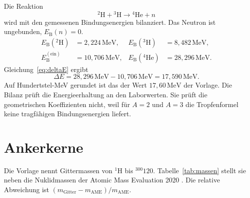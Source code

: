 \documentclass[11pt,a4paper]{article}
\theoremstyle{definition}
\theoremstyle{remark}
\newcommand{\EB}{E_{\mathrm{B}}}
\begin{document}
Die Reaktion
\begin{equation}
{}^{2}\mathrm{H}+{}^{3}\mathrm{H}\to {}^{4}\mathrm{He}+n
\end{equation}
wird mit den gemessenen Bindungsenergien bilanziert. Das Neutron ist ungebunden, \(\EB(n)=0\).
\begin{align}
\EB({}^{2}\mathrm{H})&=2{,}224\,\mathrm{MeV},&
\EB({}^{3}\mathrm{H})&=8{,}482\,\mathrm{MeV},\\
\EB^{\mathrm{(ein)}}&=10{,}706\,\mathrm{MeV},&
\EB({}^{4}\mathrm{He})&=28{,}296\,\mathrm{MeV}.
\end{align}
Gleichung~\eqref{eq:deltaE} ergibt
\begin{equation}
\Delta E=28{,}296\,\mathrm{MeV}-10{,}706\,\mathrm{MeV}=17{,}590\,\mathrm{MeV}.
\end{equation}
Auf Hundertstel-MeV gerundet ist das der Wert \(17{,}60\,\mathrm{MeV}\) der Vorlage. Die Bilanz prüft die Energieerhaltung an den Laborwerten. Sie prüft die geometrischen Koeffizienten nicht, weil für \(A=2\) und \(A=3\) die Tropfenformel keine tragfähigen Bindungsenergien liefert.

\section{Ankerkerne}
\label{sec:anker}

Die Vorlage nennt Gittermassen von \(^{1}\mathrm{H}\) bis \(^{300}120\). Tabelle~\ref{tab:massen} stellt sie neben die Nuklidmassen der Atomic Mass Evaluation 2020 \cite{AME2020}. Die relative Abweichung ist \((m_{\mathrm{Gitter}}-m_{\mathrm{AME}})/m_{\mathrm{AME}}\).
\end{document}
